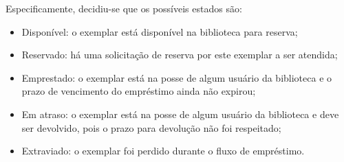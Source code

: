 \documentclass[a4paper]{article}
\begin{document}
Especificamente, decidiu-se que os possíveis estados são:
\begin{itemize}
\item Disponível: o exemplar está disponível na biblioteca para reserva;
\item Reservado: há uma solicitação de reserva por este exemplar a ser atendida;
\item Emprestado: o exemplar está na posse de algum usuário da biblioteca e o prazo de vencimento do empréstimo ainda não expirou;
\item Em atraso: o exemplar está na posse de algum usuário da biblioteca e deve ser devolvido, pois o prazo para devolução não foi respeitado;
\item Extraviado: o exemplar foi perdido durante o fluxo de empréstimo.
\end{itemize}
\end{document}
